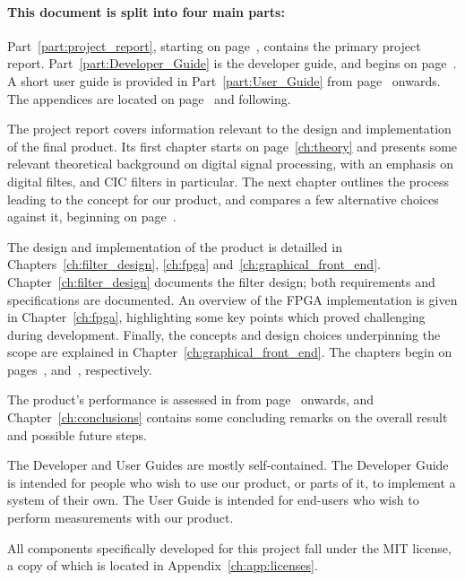 \paragraph{This        document        is        split        into        four
main        parts:} Part~\ref{part:project_report},         starting        on
page~\pageref{part:project_report},     contains    the     primary    project
report. Part~\ref{part:Developer_Guide}  is the  developer  guide, and  begins
on  page~\pageref{part:Developer_Guide}. A short  user  guide  is provided  in
Part~\ref{part:User_Guide}  from  page~\pageref{part:User_Guide}  onwards. The
appendices are located on page~\pageref{ch:app:fdesign} and following.

The   project  report   covers  information   relevant  to   the  design   and
implementation   of   the  final   product. Its   first   chapter  starts   on
page~\ref{ch:theory}  and presents  some  relevant  theoretical background  on
digital signal processing, with an emphasis on digital filtes, and CIC filters
in particular. The  next chapter outlines  the process leading to  the concept
for our product, and compares a  few alternative choices against it, beginning
on page~\pageref{ch:mission}.

The       design      and       implementation       of      the       product
is     detailled     in     Chapters~\ref{ch:filter_design},     \ref{ch:fpga}
and~\ref{ch:graphical_front_end}. Chapter~\ref{ch:filter_design} documents the
filter  design;  both  requirements   and  specifications  are  documented. An
overview  of  the  FPGA  implementation  is  given  in  Chapter~\ref{ch:fpga},
highlighting    some   key    points   which    proved   challenging    during
development. Finally,   the   concepts   and   design   choices   underpinning
the   scope   are   explained   in   Chapter~\ref{ch:graphical_front_end}. The
chapters   begin    on   pages~\pageref{ch:filter_design},   \pageref{ch:fpga}
and~\pageref{ch:graphical_front_end}, respectively.

The  product's  performance  is assessed  in  \emph{}
from page~\pageref{ch:verification}  onwards, and Chapter~\ref{ch:conclusions}
contains some  concluding remarks  on the overall  result and  possible future
steps.

The Developer and  User Guides are mostly  self-contained. The Developer Guide
is  intended for  people who  wish to  use  our product,  or parts  of it,  to
implement a system of their own. The  User Guide is intended for end-users who
wish to perform measurements with our product.

\enlargethispage{4ex}
\vspace{1ex}
\noindent All  components specifically  developed for  this project  fall under  the MIT
license, a copy of which is located in Appendix~\ref{ch:app:licenses}.

